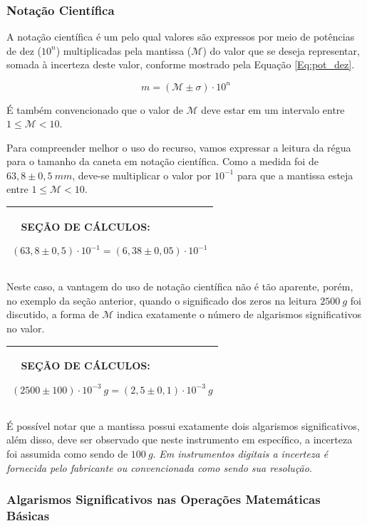 \documentclass[a4paper, 11pt]{report}
\newenvironment{myboxed}
    {
        \begin{center}
        \begin{tabular}{p{0.7\textwidth}}
        \hline\
    }
    { 
        \\\hline
        \end{tabular} 
        \end{center}
    }
\begin{document}
\subsubsection{Notação Científica}
A notação científica é um pelo qual valores são expressos por meio de 
potências de dez ($10^{n}$) multiplicadas pela mantissa ($\mathcal{M}$) do valor
 que se deseja representar, somada à incerteza deste valor, conforme mostrado pela 
 Equação \ref{Eq:pot_dez}.

 \begin{equation}
     m = (\mathcal{M} \pm \sigma) \cdot 10^n
     \label{Eq:pot_dez}
 \end{equation}

É também convencionado que o valor de $\mathcal{M}$ deve estar em um intervalo 
entre $1 \leq \mathcal{M} < 10$.

Para compreender melhor o uso do recurso, vamos expressar a leitura da régua 
para o tamanho da caneta em notação científica. Como a medida foi de 
$63,8 \pm 0,5 \: mm$, deve-se multiplicar o valor por $10^{-1}$ para que a 
mantissa esteja entre $1 \leq \mathcal{M} < 10$.

\begin{myboxed}
    \textbf{SEÇÃO DE CÁLCULOS:}

    $
        (63,8 \pm 0,5) \cdot 10^{-1} = (6,38 \pm 0,05) \cdot 10^{-1}
    $
\end{myboxed}

Neste caso, a vantagem do uso de notação científica não é tão aparente, porém, 
no exemplo da seção anterior, quando o significado dos zeros na leitura 
$2500 \: g$ foi discutido, a forma de $\mathcal{M}$ indica exatamente o número 
de algarismos significativos no valor.

\begin{myboxed}
    \textbf{SEÇÃO DE CÁLCULOS:}

    $
        (2500 \pm 100) \cdot 10^{-3} \: g = (2,5 \pm 0,1) \cdot 10^{-3} \: g
    $
\end{myboxed}

É possível notar que a mantissa possui exatamente dois algarismos 
significativos, além disso, deve ser observado que neste instrumento em 
específico, a incerteza foi assumida como sendo de $100 \: g$. \emph{Em 
instrumentos digitais a incerteza é fornecida pelo fabricante ou convencionada 
como sendo sua resolução}.

\subsubsection{Algarismos Significativos nas Operações Matemáticas 
Básicas}
\end{document}
